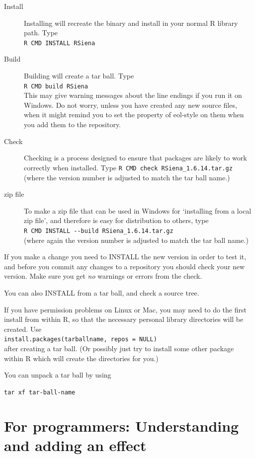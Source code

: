 \documentclass[a4paper,fleqn,11pt]{article}
\newcommand{\+}{\, + \,}
\begin{document}
\begin{description}
\item[Install] Installing will recreate the binary and install in your normal R
  library path. Type\\
\verb|R CMD INSTALL RSiena|
\item[Build] Building will create a tar ball. Type\\
\verb|R CMD build RSiena|\\
This may give warning messages about the line endings if you run it on
Windows. Do not worry, unless you have created any new source files, when it
might remind you to set the property of \textsf{eol-style} on them when you add
them to the repository.
\item [Check] Checking is a process designed to ensure that packages are likely
  to work correctly when installed. Type
\verb|R CMD check RSiena_1.6.14.tar.gz|\\
(where the version number is adjusted to match the tar ball name.)
\item[zip file] To make a zip file that can be used in Windows for
`installing from a local zip file', and therefore is easy for distribution
to others, type\\
\verb|R CMD INSTALL --build RSiena_1.6.14.tar.gz| \\
(where again the version number is adjusted to match the tar ball name.)
\end{description}

If you make a change you need to \textsf{INSTALL} the new version in order to
test it, and before you commit any changes to a repository you should
\textsf{check} your new version. Make sure you get \emph{no} warnings or
errors from the check.

You can also \textsf{INSTALL} from a tar ball, and \textsf{check} a source
tree.

If you have permission problems on Linux or Mac, you may need to do the first
install from within \textsf{R}, so that the necessary personal library
directories will be created. Use\\
\verb|install.packages(tarballname, repos = NULL)| \\after creating a tar
ball. (Or possibly just try to install some other package within R which will
create the directories for you.)

You can unpack a tar ball by using

\verb|tar xf tar-ball-name|

\section{For programmers: Understanding and adding an effect}
\end{document}

